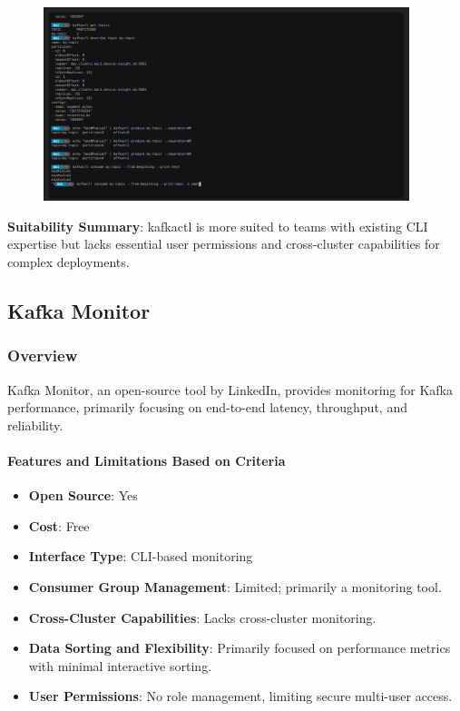 \documentclass[10pt , a4paper]{report}
\begin{document}
\begin{figure}[htbp]
  \begin{center}
    \includegraphics[width=0.95\textwidth]{imgs/Kafkactl.png}
  \end{center}
  \caption{}\label{fig:}
\end{figure}


\textbf{Suitability Summary}: kafkactl is more suited to teams with existing CLI expertise but lacks essential user permissions and cross-cluster capabilities for complex deployments.

\subsection{Kafka Monitor} 
\subsubsection*{Overview} 
Kafka Monitor, an open-source tool by LinkedIn, provides monitoring for Kafka performance, primarily focusing on end-to-end latency, throughput, and reliability.

\paragraph{Features and Limitations Based on Criteria}
\begin{itemize} 
    \item \small \textbf{Open Source}: Yes
    \item \small \textbf{Cost}: Free
    \item \small \textbf{Interface Type}: CLI-based monitoring
    \item \small \textbf{Consumer Group Management}: Limited; primarily a monitoring tool.
    \item \small \textbf{Cross-Cluster Capabilities}: Lacks cross-cluster monitoring.
    \item \small \textbf{Data Sorting and Flexibility}: Primarily focused on performance metrics with minimal interactive sorting.
    \item \small \textbf{User Permissions}: No role management, limiting secure multi-user access.
\end{itemize}
\end{document}

